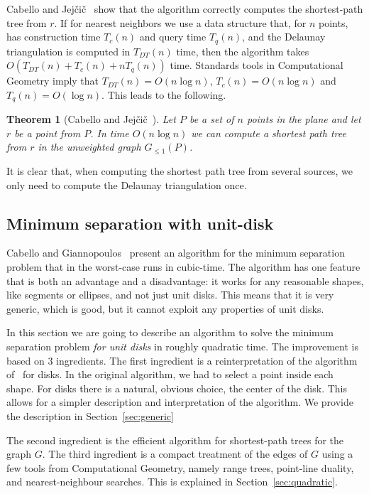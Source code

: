 \documentclass[a4paper,11pt]{article}
\newtheorem{theorem}{Theorem}
\newcommand{\GG}{\ensuremath{G_{\le 1}}}
\let\le\leqslant
\begin{document}
Cabello and Jej\v{c}i\v{c}~\cite{CJ15} show that the algorithm correctly computes
the shortest-path tree from $r$. 
If for nearest neighbors we use a data structure that,
for $n$ points, has construction time $T_c(n)$ and query time $T_q(n)$, 
and the Delaunay triangulation is computed in $T_{DT}(n)$ time,
then the algorithm takes $O(T_{DT}(n)+ T_c(n)+ n T_q(n))$ time. 
Standards tools in Computational Geometry imply that 
$T_{DT}(n)=O(n\log n)$, $T_c(n)=O(n\log n)$ and $T_q(n)=O(\log n)$.
This leads to the following.

\begin{theorem}[Cabello and Jej\v{c}i\v{c}~\cite{CJ15}]
  Let $P$ be a set of $n$ points in the plane and let $r$ be a point from $P$. 
  In time $O(n \log n)$ we can compute a shortest path tree from $r$
  in the unweighted graph $\GG(P)$.
\end{theorem}

It is clear that, when computing the shortest path tree from several sources,
we only need to compute the Delaunay triangulation once.

\subsection{Minimum separation with unit-disk}
\label{sec:algorithm-separation}

Cabello and Giannopoulos~\cite{CG16} present an algorithm
for the minimum separation problem that in the worst-case runs in cubic-time.
The algorithm has one feature that is both an advantage and a disadvantage: 
it works for any reasonable shapes, like segments or ellipses, and not just unit disks.
This means that it is very generic, which is good,
but it cannot exploit any properties of  unit disks.

In this section we are going to describe an algorithm to solve the minimum separation
problem \emph{for unit disks} in roughly quadratic time.
The improvement is based on 3 ingredients. 
The first ingredient is a reinterpretation of the algorithm of~\cite{CG16} 
for disks. In the original algorithm, we had to select a point inside each
shape. For disks there is a natural, obvious choice, the center of the disk.
This allows for a simpler description and interpretation of the algorithm.
We provide the description in Section~\ref{sec:generic}

The second ingredient is the efficient algorithm for shortest-path trees for the graph $G$.
The third ingredient is a compact treatment of the edges of $G$ using
a few tools from Computational Geometry, namely 
range trees, point-line duality, and nearest-neighbour searches.
This is explained in Section~\ref{sec:quadratic}.
\end{document}
